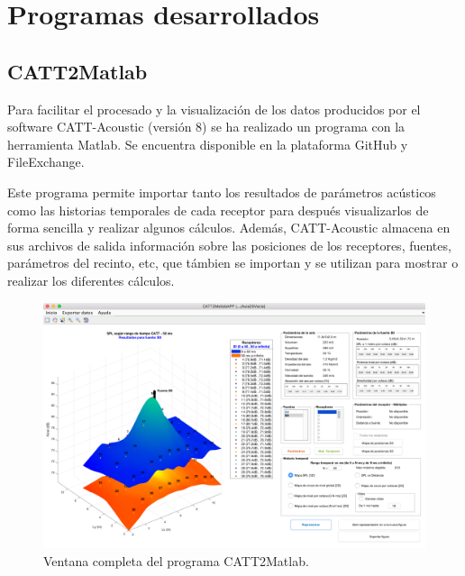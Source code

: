 
\chapter{Programas desarrollados}
\label{anexoprogramas}


\section{CATT2Matlab}
\label{catt2matlab}

Para facilitar el procesado y la visualización de los datos producidos por el software CATT-Acoustic (versión 8) se ha realizado un programa con la herramienta Matlab. Se encuentra disponible en la plataforma GitHub y FileExchange.

Este programa permite importar tanto los resultados de parámetros acústicos como las historias temporales de cada receptor para después visualizarlos de forma sencilla y realizar algunos cálculos. Además, CATT-Acoustic almacena en sus archivos de salida información sobre las posiciones de los receptores, fuentes, parámetros del recinto, etc, que támbien se importan y se utilizan para mostrar o realizar los diferentes cálculos.

\begin{figure}[ht]
    \centering
    \includegraphics[width=\textwidth]{archivos/capturas/catt2matlab1}
    \caption{Ventana completa del programa CATT2Matlab.}
\end{figure}
\FloatBarrier

